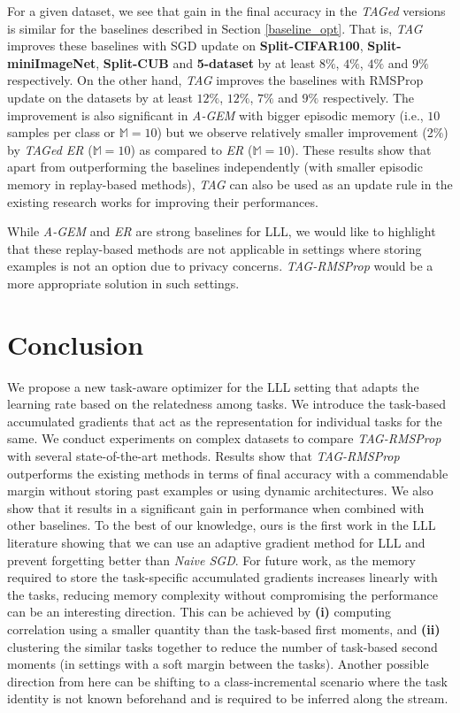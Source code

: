 \documentclass{article} \usepackage{collas2022_conference,times}
\begin{document}
    For a given dataset, we see that gain in the final accuracy in the \textit{TAGed} versions is similar for the baselines described in Section \ref{baseline_opt}. That is, \textit{TAG} improves these baselines with SGD update on \textbf{Split-CIFAR100},  \textbf{Split-miniImageNet}, \textbf{Split-CUB} and \textbf{5-dataset} by at least $8\%$, $4\%$, $4\%$ and $9\%$ respectively. On the other hand, \textit{TAG} improves the baselines with RMSProp update on the datasets by at least $12\%$, $12\%$, $7\%$ and $9\%$ respectively. The improvement is also significant in \textit{A-GEM} with bigger episodic memory (i.e., $10$ samples per class or $\mathbb{M}=10$) but we observe relatively smaller improvement (2\%) by \textit{TAGed ER} ($\mathbb{M}=10$) as compared to \textit{ER} ($\mathbb{M}=10$). These results show that apart from outperforming the baselines independently (with smaller episodic memory in replay-based methods), \textit{TAG} can also be used as an update rule in the existing research works for improving their performances. 

    While \textit{A-GEM} and \textit{ER} are strong baselines for LLL, we would like to highlight that these replay-based methods are not applicable in settings where storing examples is not an option due to privacy concerns. \textit{TAG-RMSProp} would be a more appropriate solution in such settings.
    
\section{Conclusion}
We propose a new task-aware optimizer for the LLL setting that adapts the learning rate based on the relatedness among tasks. We introduce the task-based accumulated gradients that act as the representation for individual tasks for the same. We conduct experiments on complex datasets to compare \textit{TAG-RMSProp} with several state-of-the-art methods. Results show that \textit{TAG-RMSProp} outperforms the existing methods in terms of final accuracy with a commendable margin without storing past examples or using dynamic architectures. We also show that it results in a significant gain in performance when combined with other baselines. To the best of our knowledge, ours is the first work in the LLL literature showing that we can use an adaptive gradient method for LLL and prevent forgetting better than \textit{Naive SGD}. For future work, as the memory required to store the task-specific accumulated gradients increases linearly with the tasks, reducing memory complexity without compromising the performance can be an interesting direction. This can be achieved by \textbf{(i)} computing correlation using a smaller quantity than the task-based first moments, and \textbf{(ii)} clustering the similar tasks together to reduce the number of task-based second moments (in settings with a soft margin between the tasks). Another possible direction from here can be shifting to a class-incremental scenario where the task identity is not known beforehand and is required to be inferred along the stream.
\end{document}
